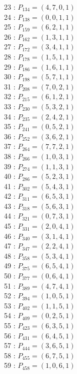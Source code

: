 \documentclass{article}
\begin{document}
{\begin{multicols}{3}
23 : $P_{134}=( 4, 7, 0, 1 )$\\
24 : $P_{138}=( 0, 0, 1, 1 )$\\
25 : $P_{159}=( 6, 2, 1, 1 )$\\
26 : $P_{162}=( 1, 3, 1, 1 )$\\
27 : $P_{172}=( 3, 4, 1, 1 )$\\
28 : $P_{178}=( 1, 5, 1, 1 )$\\
29 : $P_{186}=( 1, 6, 1, 1 )$\\
30 : $P_{198}=( 5, 7, 1, 1 )$\\
31 : $P_{208}=( 7, 0, 2, 1 )$\\
32 : $P_{215}=( 6, 1, 2, 1 )$\\
33 : $P_{230}=( 5, 3, 2, 1 )$\\
34 : $P_{235}=( 2, 4, 2, 1 )$\\
35 : $P_{241}=( 0, 5, 2, 1 )$\\
36 : $P_{252}=( 3, 6, 2, 1 )$\\
37 : $P_{264}=( 7, 7, 2, 1 )$\\
38 : $P_{266}=( 1, 0, 3, 1 )$\\
39 : $P_{274}=( 1, 1, 3, 1 )$\\
40 : $P_{286}=( 5, 2, 3, 1 )$\\
41 : $P_{302}=( 5, 4, 3, 1 )$\\
42 : $P_{311}=( 6, 5, 3, 1 )$\\
43 : $P_{318}=( 5, 6, 3, 1 )$\\
44 : $P_{321}=( 0, 7, 3, 1 )$\\
45 : $P_{331}=( 2, 0, 4, 1 )$\\
46 : $P_{340}=( 3, 1, 4, 1 )$\\
47 : $P_{347}=( 2, 2, 4, 1 )$\\
48 : $P_{358}=( 5, 3, 4, 1 )$\\
49 : $P_{375}=( 6, 5, 4, 1 )$\\
50 : $P_{377}=( 0, 6, 4, 1 )$\\
51 : $P_{389}=( 4, 7, 4, 1 )$\\
52 : $P_{394}=( 1, 0, 5, 1 )$\\
53 : $P_{402}=( 1, 1, 5, 1 )$\\
54 : $P_{409}=( 0, 2, 5, 1 )$\\
55 : $P_{423}=( 6, 3, 5, 1 )$\\
56 : $P_{431}=( 6, 4, 5, 1 )$\\
57 : $P_{444}=( 3, 6, 5, 1 )$\\
58 : $P_{455}=( 6, 7, 5, 1 )$\\
59 : $P_{458}=( 1, 0, 6, 1 )$\\

\end{multicols}}
\end{document}
